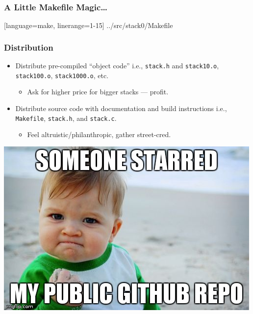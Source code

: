 \begin{frame}[fragile]

\frametitle{A Little Makefile Magic\ldots}

%
  [language=make, linerange={1-15}]%
  {../src/stack0/Makefile}

\end{frame}



\begin{frame}

\frametitle{Distribution}

\begin{itemize}

\item Distribute pre-compiled ``object code'' i.e., \texttt{stack.h} and
\texttt{stack10.o}, \texttt{stack100.o}, \texttt{stack1000.o}, etc.

\begin{itemize}

\item Ask for higher price for bigger stacks --- profit.

\end{itemize}

\item Distribute source code with documentation and build instructions i.e.,
\texttt{Makefile}, \texttt{stack.h}, and \texttt{stack.c}.

\begin{itemize}

\item Feel altruistic/philanthropic, gather street-cred.

\end{itemize}

\end{itemize}

\end{frame}


\begin{frame}

\includegraphics[width=\textwidth]{memes/github-star}

\end{frame}
